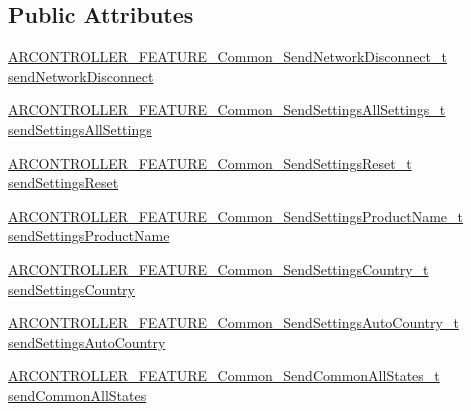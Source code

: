 \subsection*{Public Attributes}
\begin{DoxyCompactItemize}
\item 
\hyperlink{_a_r_c_o_n_t_r_o_l_l_e_r___feature_8h_ad396946d5b4a64b0fc79f24aa406dc54}{A\+R\+C\+O\+N\+T\+R\+O\+L\+L\+E\+R\+\_\+\+F\+E\+A\+T\+U\+R\+E\+\_\+\+Common\+\_\+\+Send\+Network\+Disconnect\+\_\+t} \hyperlink{struct_a_r_c_o_n_t_r_o_l_l_e_r___f_e_a_t_u_r_e___common__t_a1318c714ea4bdf8f4dabf97582731210}{send\+Network\+Disconnect}
\item 
\hyperlink{_a_r_c_o_n_t_r_o_l_l_e_r___feature_8h_a15cd3343b985cac6bd53011ff66a3f1b}{A\+R\+C\+O\+N\+T\+R\+O\+L\+L\+E\+R\+\_\+\+F\+E\+A\+T\+U\+R\+E\+\_\+\+Common\+\_\+\+Send\+Settings\+All\+Settings\+\_\+t} \hyperlink{struct_a_r_c_o_n_t_r_o_l_l_e_r___f_e_a_t_u_r_e___common__t_a0c8194448d53b5952f6f0e3e24b99429}{send\+Settings\+All\+Settings}
\item 
\hyperlink{_a_r_c_o_n_t_r_o_l_l_e_r___feature_8h_ab503fefe646908187a3f21b29088aa4d}{A\+R\+C\+O\+N\+T\+R\+O\+L\+L\+E\+R\+\_\+\+F\+E\+A\+T\+U\+R\+E\+\_\+\+Common\+\_\+\+Send\+Settings\+Reset\+\_\+t} \hyperlink{struct_a_r_c_o_n_t_r_o_l_l_e_r___f_e_a_t_u_r_e___common__t_a152b7cba1ea997a1c7023db0624b8b22}{send\+Settings\+Reset}
\item 
\hyperlink{_a_r_c_o_n_t_r_o_l_l_e_r___feature_8h_a932f9e7f30672688c66e1ddc984a5fca}{A\+R\+C\+O\+N\+T\+R\+O\+L\+L\+E\+R\+\_\+\+F\+E\+A\+T\+U\+R\+E\+\_\+\+Common\+\_\+\+Send\+Settings\+Product\+Name\+\_\+t} \hyperlink{struct_a_r_c_o_n_t_r_o_l_l_e_r___f_e_a_t_u_r_e___common__t_ae3679da5eafff44228ea60d068a3adff}{send\+Settings\+Product\+Name}
\item 
\hyperlink{_a_r_c_o_n_t_r_o_l_l_e_r___feature_8h_af051820b4834db5be6c24360f6b9de9b}{A\+R\+C\+O\+N\+T\+R\+O\+L\+L\+E\+R\+\_\+\+F\+E\+A\+T\+U\+R\+E\+\_\+\+Common\+\_\+\+Send\+Settings\+Country\+\_\+t} \hyperlink{struct_a_r_c_o_n_t_r_o_l_l_e_r___f_e_a_t_u_r_e___common__t_aba6a92f000e25d92dba5cd32e4dfec54}{send\+Settings\+Country}
\item 
\hyperlink{_a_r_c_o_n_t_r_o_l_l_e_r___feature_8h_affd8a4b19b86a66856cbde95f207fde9}{A\+R\+C\+O\+N\+T\+R\+O\+L\+L\+E\+R\+\_\+\+F\+E\+A\+T\+U\+R\+E\+\_\+\+Common\+\_\+\+Send\+Settings\+Auto\+Country\+\_\+t} \hyperlink{struct_a_r_c_o_n_t_r_o_l_l_e_r___f_e_a_t_u_r_e___common__t_a1c46cb3e68a77a2adbac8ab19b326a64}{send\+Settings\+Auto\+Country}
\item 
\hyperlink{_a_r_c_o_n_t_r_o_l_l_e_r___feature_8h_a527d68a2d7f491632638c80e3b1b2e21}{A\+R\+C\+O\+N\+T\+R\+O\+L\+L\+E\+R\+\_\+\+F\+E\+A\+T\+U\+R\+E\+\_\+\+Common\+\_\+\+Send\+Common\+All\+States\+\_\+t} \hyperlink{struct_a_r_c_o_n_t_r_o_l_l_e_r___f_e_a_t_u_r_e___common__t_ac8b651d5b49caa2bda3af8373365d6b9}{send\+Common\+All\+States}

\end{DoxyCompactItemize}
